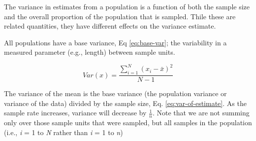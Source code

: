\documentclass[
]{article}
\newenvironment{Shaded}{\begin{snugshade}}{\end{snugshade}}
\newcommand{\CharTok}[1]{\textcolor[rgb]{0.31,0.60,0.02}{#1}}
\newcommand{\DataTypeTok}[1]{\textcolor[rgb]{0.13,0.29,0.53}{#1}}
\newcommand{\FloatTok}[1]{\textcolor[rgb]{0.00,0.00,0.81}{#1}}
\newcommand{\KeywordTok}[1]{\textcolor[rgb]{0.13,0.29,0.53}{\textbf{#1}}}
\newcommand{\NormalTok}[1]{#1}
\newcommand{\OperatorTok}[1]{\textcolor[rgb]{0.81,0.36,0.00}{\textbf{#1}}}
\newcommand{\StringTok}[1]{\textcolor[rgb]{0.31,0.60,0.02}{#1}}
\begin{document}
\begin{Shaded}
\end{Shaded}

The variance in estimates from a population is a function of both the sample
size and the overall proportion of the population that is sampled. Thile these
are related quantities, they have different effects on the variance estimate.

All populations have a base variance, Eq \eqref{eq:base-var}; the variability in
a measured parameter (e.g., length) between sample units.

\begin{equation} 
  Var(x) = \frac{\sum_{i=1}^{N} (x_i - \bar{x})^2 }{N-1}  
  \label{eq:base-var}
\end{equation}

The variance of the mean is the base variance (the
population variance or variance of the data) divided by the sample size, Eq.
\eqref{eq:var-of-estimate}. As the sample rate increases, variance will
decrease by \(\frac{1}{n}\). Note that we are not summing only over those sample
units that were sampled, but all samples in the population (i.e., \emph{i} = 1 to \emph{N}
rather than \emph{i} = 1 to \emph{n})
\end{document}
